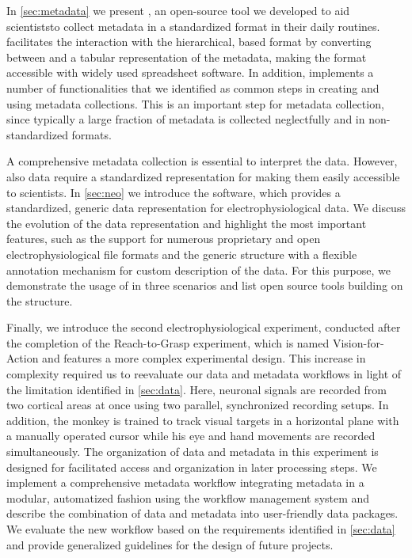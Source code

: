 In \cref{sec:metadata} we present , an open-source tool we developed to aid scientiststo collect metadata in a standardized format in their daily routines.  facilitates the interaction with the hierarchical,  based  format by converting between  and a tabular representation of the metadata, making the  format accessible with widely used spreadsheet software. In addition,  implements a number of functionalities that we identified as common steps in creating and using metadata collections. This is an important step for metadata collection, since typically a large fraction of metadata is collected neglectfully and in non-standardized formats.

A comprehensive metadata collection is essential to interpret the data. However, also data require a standardized representation for making them easily accessible to scientists. In \cref{sec:neo} we introduce the  software, which provides a standardized, generic data representation for electrophysiological data. We discuss the evolution of the  data representation and highlight the most important features, such as the support for numerous proprietary and open electrophysiological file formats and the generic structure with a flexible annotation mechanism for custom description of the data. For this purpose, we demonstrate the usage of  in three scenarios and list open source tools building on the  structure.

Finally, we introduce the second electrophysiological experiment, conducted after the completion of the Reach-to-Grasp experiment, which is named Vision-for-Action and features a more complex experimental design. This increase in complexity required us to reevaluate our data and metadata workflows in light of the limitation identified in \cref{sec:data}. Here, neuronal signals are recorded from two cortical areas at once using two parallel, synchronized recording setups. In addition, the monkey is trained to track visual targets in a horizontal plane with a manually operated cursor while his eye and hand movements are recorded simultaneously. The organization of data and metadata in this experiment is designed for facilitated access and organization in later processing steps. We implement a comprehensive metadata workflow integrating metadata in a modular, automatized fashion using the  workflow management system and describe the combination of data and metadata into user-friendly data packages. We evaluate the new workflow based on the requirements identified in \cref{sec:data} and provide generalized guidelines for the design of future projects.

